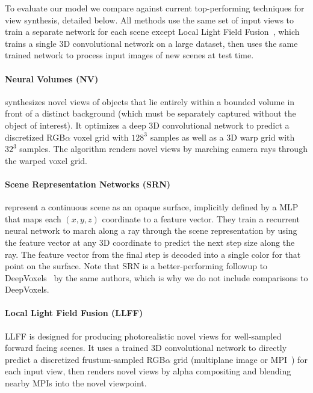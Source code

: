 \documentclass[runningheads]{llncs}
\begin{document}
To evaluate our model we compare against current top-performing techniques for view synthesis, detailed below. All methods use the same set of input views to train a separate network for each scene except Local Light Field Fusion~\cite{mildenhall19}, which trains a single 3D convolutional network on a large dataset, then uses the same trained network to process input images of new scenes at test time. 

\paragraph{\textbf{Neural Volumes (NV)}~\cite{neuralvolumes}}
synthesizes novel views of objects that lie entirely within a bounded volume in front of a distinct background (which must be separately captured without the object of interest). It optimizes a deep 3D convolutional network to predict a discretized RGB$\alpha$ voxel grid with $128^3$ samples as well as a 3D warp grid with $32^3$ samples. The algorithm renders novel views by marching camera rays through the warped voxel grid. 

\paragraph{\textbf{Scene Representation Networks (SRN)}~\cite{srn}}
represent a continuous scene as an opaque surface, implicitly defined by a MLP that maps each $(x,y,z)$ coordinate to a feature vector. They train a recurrent neural network to march along a ray through the scene representation by using the feature vector at any 3D coordinate to predict the next step size along the ray. The feature vector from the final step is decoded into a single color for that point on the surface. Note that SRN is a better-performing followup to DeepVoxels~\cite{deepvoxels} by the same authors, which is why we do not include comparisons to DeepVoxels.

\paragraph{\textbf{Local Light Field Fusion (LLFF)}~\cite{mildenhall19}}
LLFF is designed for producing photorealistic novel views for well-sampled forward facing scenes. It uses a trained 3D convolutional network to directly predict a discretized frustum-sampled RGB$\alpha$ grid (multiplane image or MPI~\cite{zhou18}) for each input view, then renders novel views by alpha compositing and blending nearby MPIs into the novel viewpoint. 
\end{document}
